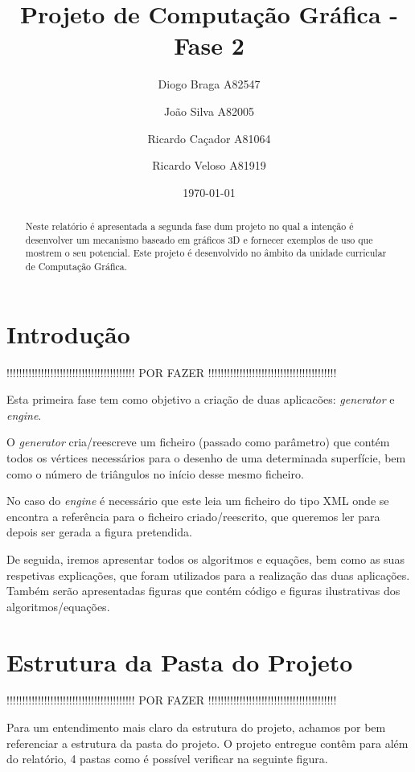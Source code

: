 \documentclass[a4paper]{article}
\title{Projeto de Computação Gráfica - Fase 2}
\author{Diogo Braga A82547 \and João Silva A82005 \and Ricardo Caçador A81064
\and Ricardo Veloso A81919}
\date{\today}
\begin{document}
\maketitle

\begin{abstract}
Neste relatório é apresentada a segunda fase dum projeto no qual a intenção é desenvolver um mecanismo baseado em gráficos 3D e fornecer exemplos de uso que mostrem o seu potencial. Este projeto é desenvolvido no âmbito da unidade curricular de Computação Gráfica.
\end{abstract}

\tableofcontents


\newpage

\section{Introdução}
\label{sec:intro}

!!!!!!!!!!!!!!!!!!!!!!!!!!!!!!!!!!!!!!!!! POR FAZER !!!!!!!!!!!!!!!!!!!!!!!!!!!!!!!!!!!!!!!!!

Esta primeira fase tem como objetivo a criação de duas aplicacões: \textit{generator} e \textit{engine}.

O \textit{generator} cria/reescreve um ficheiro (passado como parâmetro) que contém todos os vértices necessários para o desenho de uma determinada superfície, bem como o número de triângulos no início desse mesmo ficheiro.

No caso do \textit{engine} é necessário que este leia um ficheiro do tipo XML onde se encontra a referência para o ficheiro criado/reescrito, que queremos ler para depois ser gerada a figura pretendida.

De seguida, iremos apresentar todos os algoritmos e equações, bem como as suas respetivas explicações, que foram utilizados para a realização das duas aplicações. Também serão apresentadas figuras que contém código e figuras ilustrativas dos algoritmos/equações.

\section{Estrutura da Pasta do Projeto}
\label{sec:estrutura}

!!!!!!!!!!!!!!!!!!!!!!!!!!!!!!!!!!!!!!!!! POR FAZER !!!!!!!!!!!!!!!!!!!!!!!!!!!!!!!!!!!!!!!!!

Para um entendimento mais claro da estrutura do projeto, achamos por bem referenciar a estrutura da pasta do projeto.
O projeto entregue contêm para além do relatório, 4 pastas como é possível verificar na seguinte figura.
\end{document}

